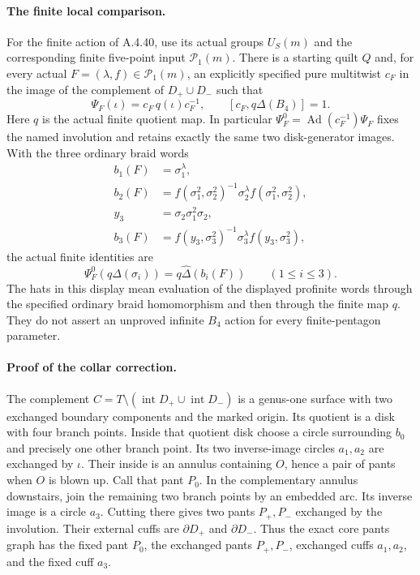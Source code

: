 \paragraph{The finite local comparison.}
For the finite action of A.4.40, use its actual groups $U_S(m)$ and
the corresponding finite five-point input $\mathcal P_1(m)$.
There is a starting quilt $Q$ and, for every actual
$F=(\lambda,f)\in\mathcal P_1(m)$, an explicitly specified pure
multitwist $c_F$ in the image of the complement of
$D_+\cup D_-$ such that
\[
 \Psi_F(\iota)=c_F\,q(\iota)c_F^{-1},\qquad
 [c_F,q\Delta(B_4)]=1.                                         \tag{DDP.4}
\]
Here $q$ is the actual finite quotient map.  In particular
$\Psi_F^0=\operatorname{Ad}(c_F^{-1})\Psi_F$ fixes the named
involution and retains exactly the same two disk-generator images.
With the three ordinary braid words
\[
 \begin{aligned}
 b_1(F)&=\sigma_1^\lambda,\\
 b_2(F)&=f(\sigma_1^2,\sigma_2^2)^{-1}
                  \sigma_2^\lambda f(\sigma_1^2,\sigma_2^2),\\
 y_3&=\sigma_2\sigma_1^2\sigma_2,\\
 b_3(F)&=f(y_3,\sigma_3^2)^{-1}
                  \sigma_3^\lambda f(y_3,\sigma_3^2),
 \end{aligned}                                                   \tag{DDP.5}
\]
the actual finite identities are
\[
          \Psi_F^0(q\Delta(\sigma_i))
                      =q\widehat\Delta(b_i(F))
                              \qquad(1\leq i\leq3).             \tag{DDP.6}
\]
The hats in this display mean evaluation of the displayed profinite
words through the specified ordinary braid homomorphism and then
through the finite map $q$.  They do not assert an unproved infinite
$B_4$ action for every finite-pentagon parameter.

\paragraph{Proof of the collar correction.}
The complement $C=T\setminus(\operatorname{int}D_+\cup
\operatorname{int}D_-)$ is a genus-one surface with two exchanged
boundary components and the marked origin.  Its quotient is a disk
with four branch points.  Inside that quotient disk choose a circle
surrounding $b_0$ and precisely one other branch point.  Its two
inverse-image circles $a_1,a_2$ are exchanged by $\iota$.
Their inside is an annulus containing $O$, hence a pair of pants
when $O$ is blown up.  Call that pant $P_0$.
In the complementary annulus downstairs, join the remaining two
branch points by an embedded arc.  Its inverse image is a circle
$a_3$.  Cutting there gives two pants $P_+,P_-$ exchanged by the
involution.  Their external cuffs are $\partial D_+$ and
$\partial D_-$.  Thus the exact core pants graph has the fixed
pant $P_0$, the exchanged pants $P_+,P_-$, exchanged cuffs
$a_1,a_2$, and the fixed cuff $a_3$.

